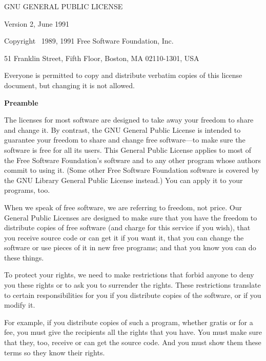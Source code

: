 \newsavebox{\gpl}
\begin{lrbox}{\gpl}
\begin{minipage}{3\textwidth}
\columnsep
\begintriplecolumns
\begincentered
  {\Large GNU GENERAL PUBLIC LICENSE\par}
  \bigskip
  {Version 2, June 1991}

  {\parindent 0in

  Copyright \textcopyright\ 1989, 1991 Free Software Foundation, Inc.

  \bigskip

  51 Franklin Street, Fifth Floor, Boston, MA  02110-1301, USA

  \bigskip

  Everyone is permitted to copy and distribute verbatim copies
  of this license document, but changing it is not allowed.
  }

  {\bf\large Preamble}
\endcentered


The licenses for most software are designed to take away your freedom to
share and change it.  By contrast, the GNU General Public License is
intended to guarantee your freedom to share and change free software---to
make sure the software is free for all its users.  This General Public
License applies to most of the Free Software Foundation's software and to
any other program whose authors commit to using it.  (Some other Free
Software Foundation software is covered by the GNU Library General Public
License instead.)  You can apply it to your programs, too.

When we speak of free software, we are referring to freedom, not price.
Our General Public Licenses are designed to make sure that you have the
freedom to distribute copies of free software (and charge for this service
if you wish), that you receive source code or can get it if you want it,
that you can change the software or use pieces of it in new free programs;
and that you know you can do these things.

To protect your rights, we need to make restrictions that forbid anyone to
deny you these rights or to ask you to surrender the rights.  These
restrictions translate to certain responsibilities for you if you
distribute copies of the software, or if you modify it.

For example, if you distribute copies of such a program, whether gratis or
for a fee, you must give the recipients all the rights that you have.  You
must make sure that they, too, receive or can get the source code.  And
you must show them these terms so they know their rights.


\end{minipage}
\end{lrbox}
